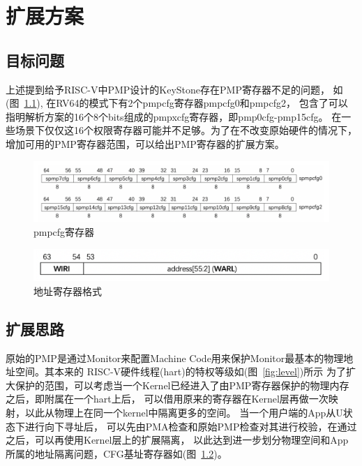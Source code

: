 \label{Chapter5} %
\chapter{扩展方案} %
\section{目标问题}
上述提到给予RISC-V\cite{keystone-p1}中PMP设计的KeyStone存在PMP寄存器不足的问题，
如(图~\ref{fig:pmpcfg}), 在RV64的模式下有2个pmpcfg寄存器pmpcfg0和pmpcfg2\cite{keystone-p3}，
包含了可以指明解析方案的16个8个bits组成的pmpxcfg寄存器，即pmp0cfg-pmp15cfg。
在一些场景下仅仅这16个权限寄存器可能并不足够\cite{keystone-p2}。为了在不改变原始硬件的情况下，
增加可用的PMP寄存器范围，可以给出PMP寄存器的扩展方案。

\begin{figure}
    \centering
    \includegraphics[scale=0.30]{Figures/extend/pmpcfg.png}
    \decoRule
    \caption{pmpcfg寄存器}
    \label{fig:pmpcfg}
\end{figure}

\begin{figure}
    \centering
    \includegraphics[scale=0.30]{Figures/extend/addrformat.png}
    \decoRule
    \caption{地址寄存器格式}
    \label{fig:addrformat}
\end{figure}

\section{扩展思路}
原始的PMP是通过Monitor来配置Machine Code用来保护Monitor最基本的物理地址空间\cite{keystone-p1}。其本来的
RISC-V硬件线程(hart)的特权等级如(图~\ref{fig:level})所示
为了扩大保护的范围，可以考虑当一个Kernel已经进入了由PMP寄存器保护的物理内存之后，即附属在一个hart上后，
可以借用原来的寄存器在Kernel层再做一次映射，以此从物理上在同一个kernel中隔离更多的空间。
当一个用户端的App从U状态下进行向下寻址后，
可以先由PMA检查和原始PMP检查对其进行校验，在通过之后，可以再使用Kernel层上的扩展隔离，
以此达到进一步划分物理空间和App所属的地址隔离问题，CFG基址寄存器如(图~\ref{fig:addrformat})。

